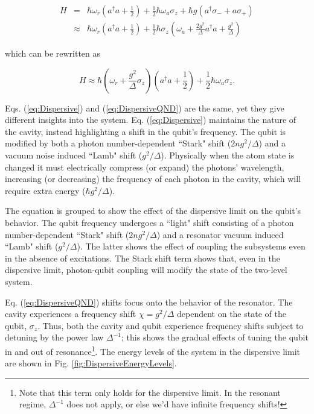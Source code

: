 \documentclass[11 pt, oneside]{book} %
\begin{document}
\begin{eqnarray}
H&=&\hbar \omega_r\left(a^\dag a + \frac{1}{2}\right) + \frac{1}{2}\hbar \omega_a \sigma_z + \hbar g(a^\dag \sigma_- + a\sigma_+) \\
&\approx& \hbar\omega_r \left( a^\dag a +\frac{1}{2}\right)+\frac{1}{2}\hbar\sigma_z\left(\omega_a+\frac{2g^2}{\Delta}a^\dag a +\frac{g^2}{\Delta}\right) \label{eq:Dispersive}
\end{eqnarray}

which can be rewritten as 

\begin{equation}\label{eq:DispersiveQND}
H\approx \hbar\left( \omega_r+\frac{g^2}{\Delta}\sigma_z\right) \left(a^\dag a+\frac{1}{2}\right)+\frac{1}{2}\hbar\omega_a\sigma_z.
\end{equation}

Eqs. (\ref{eq:Dispersive}) and (\ref{eq:DispersiveQND}) are the same, yet they give different insights into the system. Eq. (\ref{eq:Dispersive}) maintains the nature of the cavity, instead highlighting a shift in the qubit's frequency. The qubit is modified by both a photon number-dependent ``Stark" shift ($2ng^2/\Delta$) and a vacuum noise induced ``Lamb" shift ($g^2/\Delta$). Physically when the atom state is changed it must electrically compress (or expand) the photons' wavelength, increasing (or decreasing) the frequency of each photon in the cavity, which will require extra energy ($\hbar g^2/\Delta$).

The equation is grouped to show the effect of the dispersive limit on the qubit's behavior. The qubit frequency undergoes a ``light" shift consisting of a photon number-dependent ``Stark" shift ($2ng^2/\Delta$) and a resonator vacuum induced ``Lamb" shift ($g^2/\Delta$)\cite{Schuster}. The latter shows the effect of coupling the subsystems even in the absence of excitations. The Stark shift term shows that, even in the dispersive limit, photon-qubit coupling will modify the state of the two-level system. 

Eq. (\ref{eq:DispersiveQND}) shifts focus onto the behavior of the resonator. The cavity experiences a frequency shift $\chi=g^2/\Delta$ dependent on the state of the qubit, $\sigma_z$. Thus, both the cavity and qubit experience frequency shifts subject to detuning by the power law $\Delta^{-1}$; this shows the gradual effects of tuning the qubit in and out of resonance\footnote{Note that this term only holds for the dispersive limit. In the resonant regime, $\Delta^{-1}$ does not apply, or else we'd have infinite frequency shifts!}. The energy levels of the system in the dispersive limit are shown in Fig. \ref{fig:DispersiveEnergyLevels}.
\end{document}
